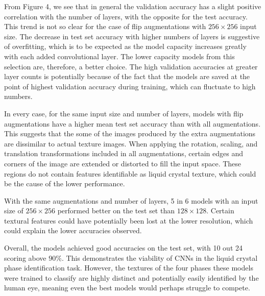 \documentclass[12pt]{article}
\begin{document}
From Figure 4, we see that in general the validation accuracy has a slight positive correlation with the number of layers, with the opposite for the test accuracy. This trend is not so clear for the case of flip augmentations with $256 \times 256$ input size. The decrease in test set accuracy with higher numbers of layers is suggestive of overfitting, which is to be expected as the model capacity increases greatly with each added convolutional layer. The lower capacity models from this selection are, therefore, a better choice. The high validation accuracies at greater layer counts is potentially because of the fact that the models are saved at the point of highest validation accuracy during training, which can fluctuate to high numbers.

In every case, for the same input size and number of layers, models with flip augmentations have a higher mean test set accuracy than with all augmentations. This suggests that the some of the images produced by the extra augmentations are dissimilar to actual texture images. When applying the rotation, scaling, and translation transformations included in all augmentations, certain edges and corners of the image are extended or distorted to fill the input space. These regions do not contain features identifiable as liquid crystal texture, which could be the cause of the lower performance.

With the same augmentations and number of layers, 5 in 6 models with an input size of $256 \times 256$ performed better on the test set than $128 \times 128$. Certain textural features could have potentially been lost at the lower resolution, which could explain the lower accuracies observed.

Overall, the models achieved good accuracies on the test set, with 10 out 24 scoring above $90\%$. This demonstrates the viability of CNNs in the liquid crystal phase identification task. However, the textures of the four phases these models were trained to classify are highly distinct and potentially easily identified by the human eye, meaning even the best models would perhaps struggle to compete.
\end{document}

